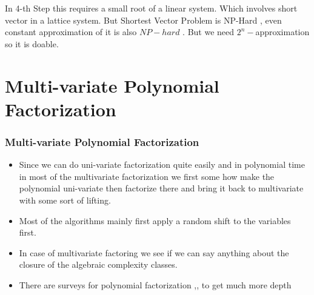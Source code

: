 \documentclass[10pt]{beamer}
\begin{document}
\begin{frame}[allowframebreaks]
In 4-th Step this requires a small root of a linear system. Which involves short vector in a lattice system.  But Shortest Vector Problem is NP-Hard \cite{svpnph}, even constant approximation of it is also $NP-hard$ \cite{svpconstap}. But we need $2^n-$approximation so it is doable.

\end{frame}

\section{Multi-variate Polynomial Factorization}

\begin{frame}
	\frametitle{Multi-variate Polynomial Factorization}
\begin{itemize}
	\item Since we can do uni-variate factorization quite easily and in polynomial time in most of the multivariate factorization we first some how make the polynomial  uni-variate  then factorize there and bring it back to multivariate with some sort of lifting.
	\item Most of the algorithms mainly first apply a random shift to the variables first. 
	\item In case of multivariate factoring we see if we can say anything about the closure of the algebraic complexity classes.
	\item There are surveys for polynomial factorization \cite{kalsurvey},\cite{Kaltofen2020PolynomialF1},\cite{forbessurvey} to get much more depth
\end{itemize}
\end{frame}

\end{document}
